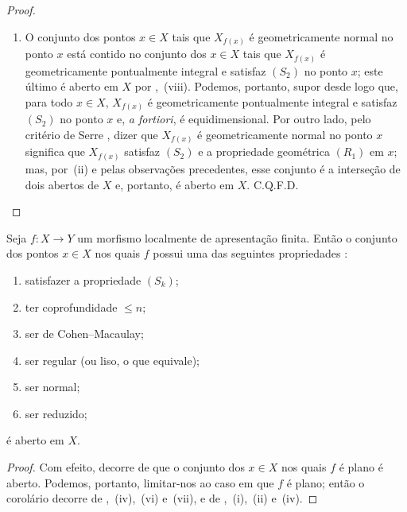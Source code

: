 \begin{proof}
\begin{enumerate}[label=(\roman*)]
\item[(iv)] O conjunto dos pontos $x\in X$ tais
que $X_{f(x)}$ é geometricamente normal no
ponto $x$ está contido no conjunto dos
$x\in X$ tais que $X_{f(x)}$ é geometricamente
pontualmente integral e satisfaz $(S_2)$ no
ponto $x$; este último é aberto em $X$ por
,~(viii). Podemos, portanto,
supor desde logo que, para todo $x\in X$,
$X_{f(x)}$ é geometricamente pontualmente
integral e satisfaz $(S_2)$ no ponto $x$ e,
\emph{a fortiori}, é equidimensional. Por outro
lado, pelo critério de Serre ,
dizer que $X_{f(x)}$ é geometricamente normal
no ponto $x$ significa que $X_{f(x)}$ satisfaz
$(S_2)$ e a propriedade geométrica $(R_1)$
em $x$;
mas, por~(ii) e pelas observações precedentes,
esse conjunto é a interseção de dois abertos
de $X$ e, portanto, é aberto em $X$. C.Q.F.D.
\end{enumerate}
\end{proof}

\begin{corollary}[12.1.7]
\label{IV.12.1.7}
Seja $f:X\to Y$ um morfismo localmente de
apresentação finita. Então o conjunto dos pontos
$x\in X$ nos quais $f$ possui uma das seguintes
propriedades :
\begin{enumerate}[label=(\roman*)]
\item satisfazer a propriedade $(S_k)$;
\item ter coprofundidade $\leq n$;
\item ser de Cohen--Macaulay;
\item ser regular (ou liso, o que equivale);
\item ser normal;
\item ser reduzido;
\end{enumerate}
é aberto em $X$.
\end{corollary}

\begin{proof}
Com efeito, decorre de  que o
conjunto dos $x\in X$ nos quais $f$ é plano é
aberto. Podemos, portanto, limitar-nos ao caso
em que $f$ é plano; então o corolário decorre
de ,~(iv),~(vi) e~(vii), e de
,~(i),~(ii) e~(iv).
\end{proof}

